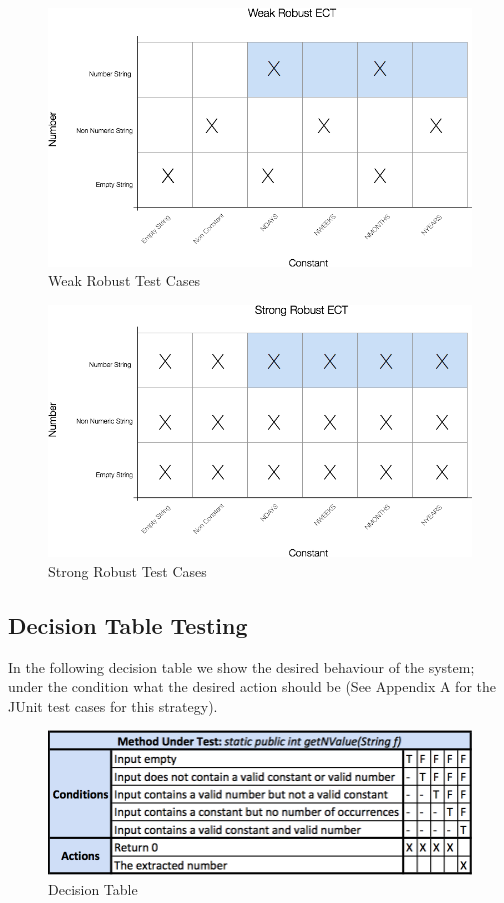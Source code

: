 \begin{figure}[htbp]
\centering
\includegraphics{../assets/weak-robust.png}
\caption{Weak Robust Test Cases}
\end{figure}

\begin{figure}[htbp]
\centering
\includegraphics{../assets/strong-robust.png}
\caption{Strong Robust Test Cases}
\end{figure}

\newpage

\subsection{Decision Table Testing}\label{decision-table-testing}

In the following decision table we show the desired behaviour of the
system; under the condition what the desired action should be (See
Appendix A for the JUnit test cases for this strategy).

\begin{figure}[htbp]
\centering
\includegraphics{../assets/decision-table.png}
\caption{Decision Table}
\end{figure}

